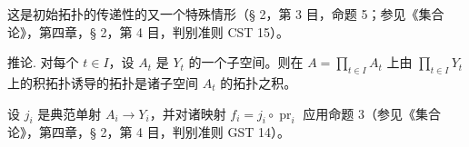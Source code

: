 这是初始拓扑的传递性的又一个特殊情形（§ 2，第 3 目，命题 5；参见《集合论》，第四章，§ 2，第 4 目，判别准则 CST 15）。

推论. 对每个 \(t \in I\)，设 \(A_{t}\) 是 \(Y_{t}\) 的一个子空间。则在 \(A = \prod_{t \in I} A_{t}\) 上由 \(\prod_{t \in I} Y_{t}\) 上的积拓扑诱导的拓扑是诸子空间 \(A_{t}\) 的拓扑之积。

设 \(j_{i}\) 是典范单射 \(A_{i} \to Y_{i}\)，并对诸映射 \(f_{i} = j_{i} \circ \operatorname{pr}_{i}\) 应用命题 3（参见《集合论》，第四章，§ 2，第 4 目，判别准则 GST 14）。

